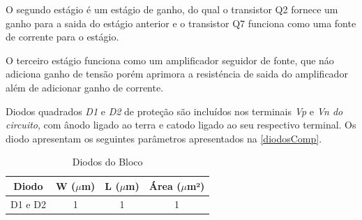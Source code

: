 O segundo est\'agio \'e um est\'agio de ganho, do qual o transistor Q2 fornece um ganho para a saida do est\'agio anterior e o transistor Q7 funciona como uma fonte de corrente para o est\'agio.

O terceiro est\'agio funciona como um amplificador seguidor de fonte, que n\'ao adiciona ganho de tens\~ao por\'em aprimora a resist\'encia de saida do amplificador al\'em de adicionar ganho de corrente.

Diodos quadrados \emph{D1} e \emph{D2} de prote{\c c}\~ao s\~ao inclu\'idos nos terminais \emph{Vp} e \emph{Vn do circuito}, com \^anodo ligado ao terra e catodo ligado ao seu respectivo terminal. Os diodo apresentam os seguintes par\^ametros apresentados na \autoref{diodosComp}.

\begin{table}[htbp]
\caption{Diodos do Bloco \NomeBloco}
\label{diodosComp}
\centering
\begin{tabular}{cccc}
\toprule
Diodo & W ($\mu$m)  & L ($\mu$m)           & \'Area ($\mu$m²)\\
\midrule \midrule
D1 e D2 & 1 & 1 & 1 \\

\bottomrule
\end{tabular}
\end{table}
\clearpage